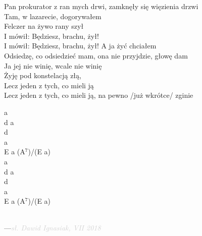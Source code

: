 \documentclass[a5paper, 10pt]{book}
\begin{document}
\newpage
\begin{minipage}[t]{0.8\textwidth}
  Pan prokurator z ran mych drwi, zamknęły się więzienia drzwi\\
Tam, w lazarecie, dogorywałem\\
\hspace*{5mm}Felczer na żywo rany szył\\
\hspace*{5mm}I mówił: Będziesz, brachu, żył!\\
\hspace*{5mm}I mówił: Będziesz, brachu, żył! A ja żyć chciałem\\

Odsiedzę, co odsiedzieć mam, ona nie przyjdzie, głowę dam\\
Ja jej nie winię, wcale nie winię\\
\hspace*{5mm}Żyję pod konstelacją złą,\\
\hspace*{5mm}Lecz jeden z tych, co mieli ją\\
\hspace*{5mm}Lecz jeden z tych, co mieli ją, na pewno /już wkrótce/ zginie\\
\end{minipage}
\begin{minipage}[t]{0.2\textwidth}
  a\\
d a\\
d\\
a\\
E a (A$^7$)/(E a)\\

a\\
d a\\
d\\
a\\
E a (A$^7$)/(E a)\\
\end{minipage}
\vspace*{2cm}\\
---\hfill\textcolor{lightgray}{\textit{sł. Dawid Ignasiak, VII 2018}}\\~\\
\end{document}
